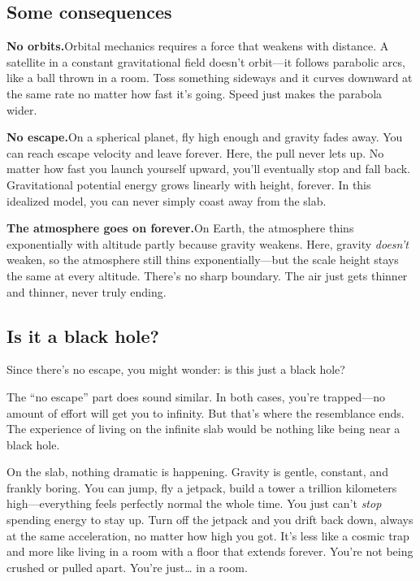 \documentclass[11pt, letterpaper]{article}
\begin{document}
\subsection{Some consequences}

\textbf{No orbits.}\quad Orbital mechanics requires a force that weakens with distance. A satellite in a constant gravitational field doesn't orbit---it follows parabolic arcs, like a ball thrown in a room. Toss something sideways and it curves downward at the same rate no matter how fast it's going. Speed just makes the parabola wider.

\textbf{No escape.}\quad On a spherical planet, fly high enough and gravity fades away. You can reach escape velocity and leave forever. Here, the pull never lets up. No matter how fast you launch yourself upward, you'll eventually stop and fall back. Gravitational potential energy grows linearly with height, forever. In this idealized model, you can never simply coast away from the slab.

\textbf{The atmosphere goes on forever.}\quad On Earth, the atmosphere thins exponentially with altitude partly because gravity weakens. Here, gravity \textit{doesn't} weaken, so the atmosphere still thins exponentially---but the scale height stays the same at every altitude. There's no sharp boundary. The air just gets thinner and thinner, never truly ending.

\subsection{Is it a black hole?}

Since there's no escape, you might wonder: is this just a black hole?

The ``no escape'' part does sound similar. In both cases, you're trapped---no amount of effort will get you to infinity. But that's where the resemblance ends. The experience of living on the infinite slab would be nothing like being near a black hole.

On the slab, nothing dramatic is happening. Gravity is gentle, constant, and frankly boring. You can jump, fly a jetpack, build a tower a trillion kilometers high---everything feels perfectly normal the whole time. You just can't \textit{stop} spending energy to stay up. Turn off the jetpack and you drift back down, always at the same acceleration, no matter how high you got. It's less like a cosmic trap and more like living in a room with a floor that extends forever. You're not being crushed or pulled apart. You're just\ldots{} in a room.
\end{document}
